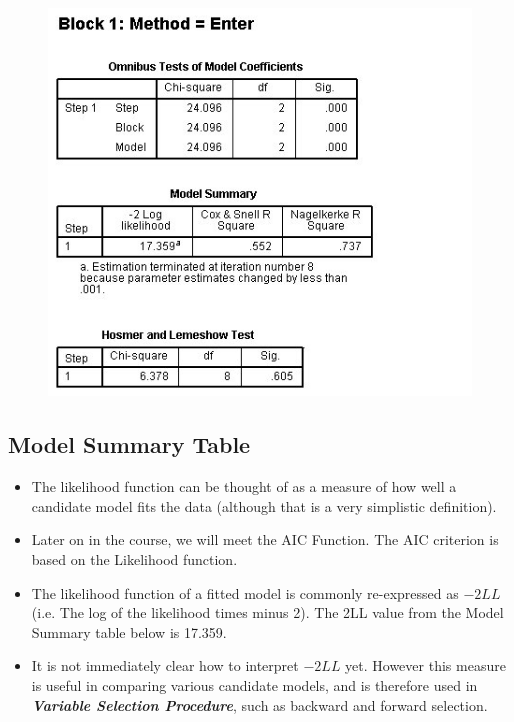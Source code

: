 \documentclass[a4paper,12pt]{article}
\begin{document}
\begin{figure}[h!]
	\centering
	\includegraphics[width=0.9\linewidth]{images/Logistic5}
\end{figure}





\newpage







\subsection{Model Summary Table}

\begin{itemize}
	\item The likelihood function can be thought of as a measure of how well a candidate model fits the data (although that is a very simplistic definition). 
	\item Later on in the course, we will meet the AIC Function. The AIC criterion is based on the Likelihood function.
	\item The likelihood function of a fitted model is commonly re-expressed as $-2LL$ (i.e. The log of the likelihood times minus 2). The 2LL value from the Model Summary table below is 17.359.
	\item It is not immediately clear how to interpret $-2LL$ yet. However this measure is useful in comparing various candidate models, and is therefore used in \textbf{\textit{Variable Selection Procedure}}, such as backward and forward selection.
\end{itemize}
\end{document}
